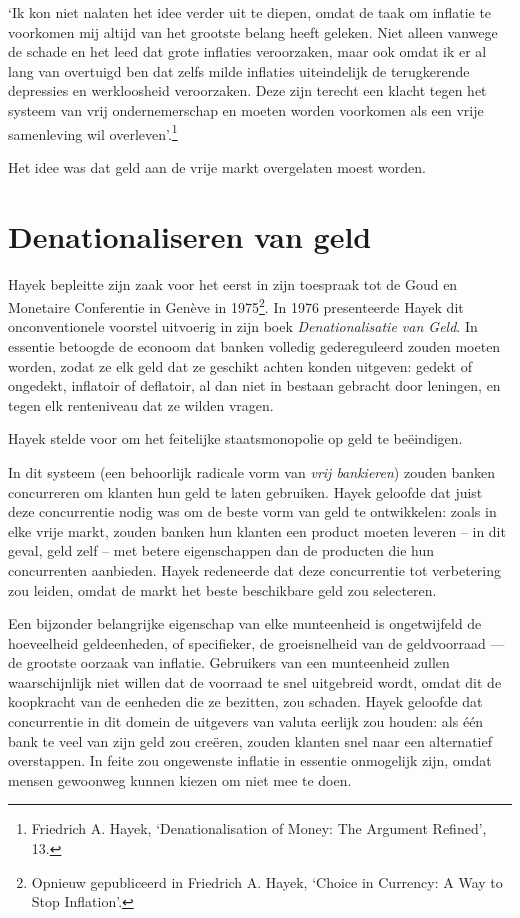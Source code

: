 \documentclass[smalldemyvopaper,11pt,twoside,onecolumn,openright,extrafontsizes,hidelinks]{memoir}
\begin{document}
`Ik kon niet nalaten het idee verder uit te diepen, omdat de taak om
inflatie te voorkomen mij altijd van het grootste belang heeft geleken.
Niet alleen vanwege de schade en het leed dat grote inflaties
veroorzaken, maar ook omdat ik er al lang van overtuigd ben dat zelfs
milde inflaties uiteindelijk de terugkerende depressies en werkloosheid
veroorzaken. Deze zijn terecht een klacht tegen het systeem van vrij
ondernemerschap en moeten worden voorkomen als een vrije samenleving wil
overleven'.\footnote{\hspace{0pt}Friedrich A. Hayek, `Denationalisation
  of Money: The Argument Refined', 13.}

Het idee was dat geld aan de vrije markt overgelaten moest worden.

\section{Denationaliseren van geld}\label{denationaliseren-van-geld}

Hayek bepleitte zijn zaak voor het eerst in zijn toespraak tot de Goud
en Monetaire Conferentie in Genève in 1975\footnote{Opnieuw gepubliceerd
  in Friedrich A. Hayek, `Choice in Currency: A Way to Stop Inflation'.}.
In 1976 presenteerde Hayek dit onconventionele voorstel uitvoerig in
zijn boek \emph{Denationalisatie van Geld}. In essentie betoogde de
econoom dat banken volledig gedereguleerd zouden moeten worden, zodat ze
elk geld dat ze geschikt achten konden uitgeven: gedekt of ongedekt,
inflatoir of deflatoir, al dan niet in bestaan gebracht door leningen,
en tegen elk renteniveau dat ze wilden vragen.

Hayek stelde voor om het feitelijke staatsmonopolie op geld te
beëindigen.

In dit systeem (een behoorlijk radicale vorm van \emph{vrij bankieren})
zouden banken concurreren om klanten hun geld te laten gebruiken. Hayek
geloofde dat juist deze concurrentie nodig was om de beste vorm van geld
te ontwikkelen: zoals in elke vrije markt, zouden banken hun klanten een
product moeten leveren -- in dit geval, geld zelf -- met betere
eigenschappen dan de producten die hun concurrenten aanbieden. Hayek
redeneerde dat deze concurrentie tot verbetering zou leiden, omdat de
markt het beste beschikbare geld zou selecteren.

Een bijzonder belangrijke eigenschap van elke munteenheid is
ongetwijfeld de hoeveelheid geldeenheden, of specifieker, de
groeisnelheid van de geldvoorraad --- de grootste oorzaak van inflatie.
Gebruikers van een munteenheid zullen waarschijnlijk niet willen dat de
voorraad te snel uitgebreid wordt, omdat dit de koopkracht van de
eenheden die ze bezitten, zou schaden. Hayek geloofde dat concurrentie
in dit domein de uitgevers van valuta eerlijk zou houden: als één bank
te veel van zijn geld zou creëren, zouden klanten snel naar een
alternatief overstappen. In feite zou ongewenste inflatie in essentie
onmogelijk zijn, omdat mensen gewoonweg kunnen kiezen om niet mee te
doen.
\end{document}
